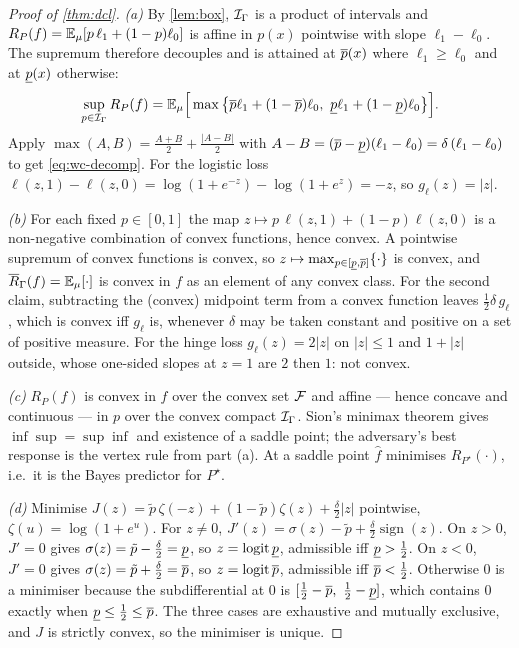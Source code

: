 \begin{proof}[Proof of \cref{thm:dcl}]
\emph{(a)} By \cref{lem:box}, $\mathcal{I}_\Gamma$ is a product of intervals and
$R_P(f)=\mathbb{E}_\mu[p\,\ell_1+(1-p)\ell_0]$ is affine in $p(x)$ pointwise with slope
$\ell_1-\ell_0$. The supremum therefore decouples and is attained at
$\overline{p}(x)$ where $\ell_1\ge\ell_0$ and at $\underline{p}(x)$ otherwise:
\[
  \sup_{p\in\I_\Gamma}R_P(f)
  = \E_\mu\Big[\max\big\{\pup\ell_1+(1-\pup)\ell_0,\ \plo\ell_1+(1-\plo)\ell_0\big\}\Big].
\]
Apply $\max(A,B)=\tfrac{A+B}{2}+\tfrac{|A-B|}{2}$ with
$A-B=(\overline{p}-\underline{p})(\ell_1-\ell_0)=\delta\,(\ell_1-\ell_0)$ to get
\eqref{eq:wc-decomp}. For the logistic loss
$\ell(z,1)-\ell(z,0)=\log(1+e^{-z})-\log(1+e^{z})=-z$, so $g_\ell(z)=|z|$.

\emph{(b)} For each fixed $p\in[0,1]$ the map
$z\mapsto p\,\ell(z,1)+(1-p)\ell(z,0)$ is a non-negative combination of convex
functions, hence convex. A pointwise supremum of convex functions is convex, so
$z\mapsto\max_{p\in[\underline{p},\overline{p}]}\{\cdot\}$ is convex, and
$\overline{R}_\Gamma(f)=\mathbb{E}_\mu[\cdot]$ is convex in $f$ as an element of any convex
class. For the second claim, subtracting the (convex) midpoint term from a
convex function leaves $\tfrac12\delta\,g_\ell$, which is convex iff $g_\ell$ is,
whenever $\delta$ may be taken constant and positive on a set of positive
measure. For the hinge loss $g_\ell(z)=2|z|$ on $|z|\le1$ and $1+|z|$ outside,
whose one-sided slopes at $z=1$ are $2$ then $1$: not convex.

\emph{(c)} $R_P(f)$ is convex in $f$ over the convex set $\mathcal{F}$ and affine --- hence
concave and continuous --- in $p$ over the convex compact $\mathcal{I}_\Gamma$. Sion's
minimax theorem \citep{sion1958general} gives $\inf\sup=\sup\inf$ and existence
of a saddle point; the adversary's best response is the vertex rule from part
(a). At a saddle point $\hat f$ minimises $R_{P^\star}(\cdot)$, i.e.\ it is the
Bayes predictor for $P^\star$.

\emph{(d)} Minimise $J(z)=\tilde p\,\zeta(-z)+(1-\tilde p)\zeta(z)
+\tfrac{\delta}{2}|z|$ pointwise, $\zeta(u)=\log(1+e^{u})$. For $z\neq0$,
$J'(z)=\sigma(z)-\tilde p+\tfrac{\delta}{2}\operatorname{sign}(z)$. On $z>0$,
$J'=0$ gives $\sigma(z)=\tilde p-\tfrac{\delta}{2}=\underline{p}$, so
$z=\operatorname{logit}\underline{p}$, admissible iff $\underline{p}>\tfrac12$. On $z<0$, $J'=0$ gives
$\sigma(z)=\tilde p+\tfrac{\delta}{2}=\overline{p}$, so $z=\operatorname{logit}\overline{p}$, admissible iff
$\overline{p}<\tfrac12$. Otherwise $0$ is a minimiser because the subdifferential at $0$
is $[\tfrac12-\overline{p},\ \tfrac12-\underline{p}]$, which contains $0$ exactly when
$\underline{p}\le\tfrac12\le\overline{p}$. The three cases are exhaustive and mutually exclusive,
and $J$ is strictly convex, so the minimiser is unique.
\end{proof}

